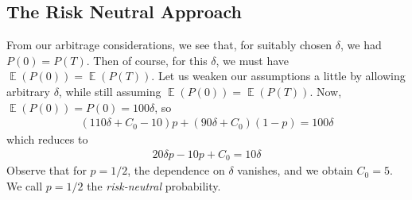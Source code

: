 \documentclass[12pt]{article}
\DeclareMathOperator{\ex}{\mathbb{E}}
\theoremstyle{plain}
\theoremstyle{definition}
\theoremstyle{remark}
\numberwithin{equation}{section}  %
\begin{document}
	\subsection{The Risk Neutral Approach}
	From our arbitrage considerations, we see that, for suitably chosen
	$\delta$, we had $P(0) = P(T)$. Then of course, for this $\delta$, we must
	have $\ex(P(0)) = \ex(P(T))$. Let us weaken our assumptions a little by allowing
	arbitrary $\delta$, while still assuming $\ex(P(0)) = \ex(P(T))$. 
	Now, $\ex(P(0)) = P(0) = 100 \delta$, so
	\begin{equation*}
		\begin{split}
			(110 \delta + C_{0} - 10) p + (90 \delta + C_{0}) (1- p) = 100 \delta
		\end{split}
	\end{equation*}
	which reduces to
	\begin{equation*}
		\begin{split}
			20 \delta p - 10p + C_{0} = 10 \delta
		\end{split}
	\end{equation*}
	Observe that for $p = 1/2$, the dependence on $\delta$ vanishes, and we obtain
	$C_{0} = 5$. We call $p = 1/2$ the \emph{risk-neutral} probability.
\end{document}
